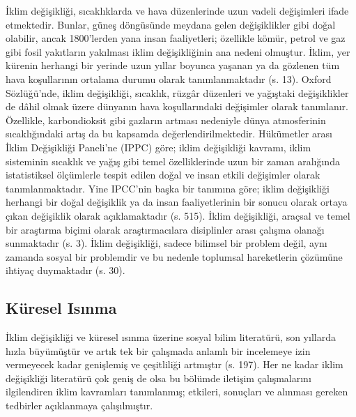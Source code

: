\documentclass[
]{book}
\begin{document}
İklim değişikliği, sıcaklıklarda ve hava düzenlerinde uzun vadeli değişimleri ifade etmektedir. Bunlar, güneş döngüsünde meydana gelen değişiklikler gibi doğal olabilir, ancak 1800'lerden yana insan faaliyetleri; özellikle kömür, petrol ve gaz gibi fosil yakıtların yakılması iklim değişikliğinin ana nedeni olmuştur. \citep{unfccwiki} İklim, yer kürenin herhangi bir yerinde uzun yıllar boyunca yaşanan ya da gözlenen tüm hava koşullarının ortalama durumu olarak tanımlanmaktadır (s. 13). \citep{basucurehberi2008} Oxford Sözlüğü'nde, iklim değişikliği, sıcaklık, rüzgâr düzenleri ve yağıştaki değişiklikler de dâhil olmak üzere dünyanın hava koşullarındaki değişimler olarak tanımlanır. \citep{oxfordlearnersdict_climatechange} Özellikle, karbondioksit gibi gazların artması nedeniyle dünya atmosferinin sıcaklığındaki artış da bu kapsamda değerlendirilmektedir. Hükümetler arası İklim Değişikliği Paneli'ne (IPPC) göre; iklim değişikliği kavramı, iklim sisteminin sıcaklık ve yağış gibi temel özelliklerinde uzun bir zaman aralığında istatistiksel ölçümlerle tespit edilen doğal ve insan etkili değişimler olarak tanımlanmaktadır. \citep{dogan2011kuresel} Yine IPCC'nin başka bir tanımına göre; iklim değişikliği herhangi bir doğal değişiklik ya da insan faaliyetlerinin bir sonucu olarak ortaya çıkan değişiklik olarak açıklamaktadır (s. 515). \citep{pielke2004what} İklim değişikliği, araçsal ve temel bir araştırma biçimi olarak araştırmacılara disiplinler arası çalışma olanağı sunmaktadır (s. 3). \citep{serrao2018science} İklim değişikliği, sadece bilimsel bir problem değil, aynı zamanda sosyal bir problemdir ve bu nedenle toplumsal hareketlerin çözümüne ihtiyaç duymaktadır (s. 30). \citep{hansen2016communicating}

\hypertarget{kuxfcresel-isux131nma}{%
\subsection{Küresel Isınma}\label{kuxfcresel-isux131nma}}

İklim değişikliği ve küresel ısınma üzerine sosyal bilim literatürü, son yıllarda hızla büyümüştür ve artık tek bir çalışmada anlamlı bir incelemeye izin vermeyecek kadar genişlemiş ve çeşitliliği artmıştır (s. 197). \citep{mcadam2017social} Her ne kadar iklim değişikliği literatürü çok geniş de olsa bu bölümde iletişim çalışmalarını ilgilendiren iklim kavramları tanımlanmış; etkileri, sonuçları ve alınması gereken tedbirler açıklanmaya çalışılmıştır.
\end{document}
